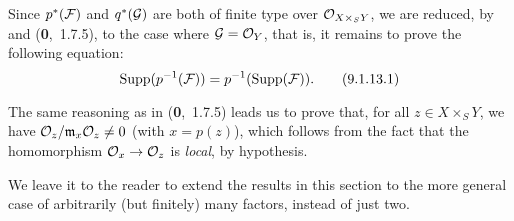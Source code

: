 Since $p^\ast(\mathcal{F})$ and $q^\ast(\mathcal{G})$ are both of finite type over
$\mathcal{O}_{X\times_S Y}$, we are reduced, by  and (\textbf{0},~1.7.5), to
the case where $\mathcal{G}=\mathcal{O}_Y$, that is, it remains to prove the following
equation:
\[
  \operatorname{Supp}(p^{-1}(\mathcal{F}))=p^{-1}(\operatorname{Supp}(\mathcal{F})).\tag{9.1.13.1}
\]

The same reasoning as in (\textbf{0},~1.7.5) leads us to prove that, for all
$z\in X\times_S Y$, we have $\mathcal{O}_z/\mathfrak{m}_x\mathcal{O}_z\neq0$ (with $x=p(z)$),
which follows from the fact that the homomorphism $\mathcal{O}_x\to\mathcal{O}_z$ is \emph{local},
by hypothesis.

We leave it to the reader to extend the results in this section to the more
general case of arbitrarily (but finitely) many factors, instead of just two.

